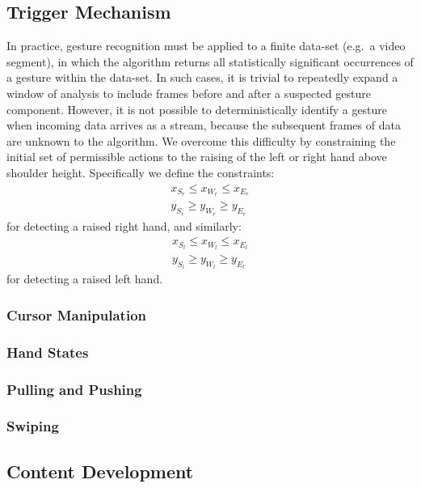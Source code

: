 \documentclass{scrartcl}
\begin{document}
      \subsection{Trigger Mechanism}
      In practice, gesture recognition must be applied to a finite data-set (e.g.~a video segment), in which the algorithm returns all statistically significant occurrences of a gesture within the data-set. In such cases, it is trivial to repeatedly expand a window of analysis to include frames before and after a suspected gesture component. However, it is not possible to deterministically identify a gesture when incoming data arrives as a stream, because the subsequent frames of data are unknown to the algorithm. We overcome this difficulty by constraining the initial set of permissible actions to the raising of the left or right hand above shoulder height. Specifically we define the constraints:
      \begin{align}
        x_{S_r} \leq x_{W_r} \leq x_{E_r} \\
        y_{S_r} \geq y_{W_r} \geq y_{E_r}
      \end{align}
      for detecting a raised right hand, and similarly:
      \begin{align}
        x_{S_l} \leq x_{W_l} \leq x_{E_l} \\
        y_{S_l} \geq y_{W_l} \geq y_{E_l}
      \end{align}
      for detecting a raised left hand.
      \subsubsection{Cursor Manipulation}
      \subsubsection{Hand States}
      \subsubsection{Pulling and Pushing}
      \subsubsection{Swiping}
    \subsection{Content Development\label{phase4}}
\end{document}
